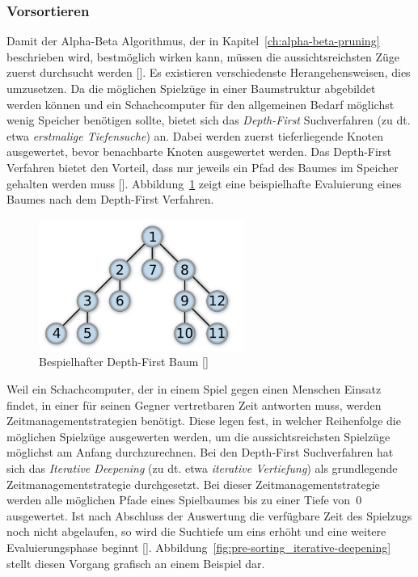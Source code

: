 \subsubsection{Vorsortieren}

Damit der Alpha-Beta Algorithmus, der in Kapitel~\ref{ch:alpha-beta-pruning} beschrieben wird, bestmöglich wirken kann, müssen die aussichtsreichsten Züge zuerst durchsucht werden [\cite{Wiki2019}].
Es existieren verschiedenste Herangehensweisen, dies umzusetzen.
Da die möglichen Spielzüge in einer Baumstruktur abgebildet werden können und ein Schachcomputer für den allgemeinen Bedarf möglichst wenig Speicher benötigen sollte, bietet sich das \textit{Depth-First} Suchverfahren (zu dt. etwa \textit{erstmalige Tiefensuche}) an.
Dabei werden zuerst tieferliegende Knoten ausgewertet, bevor benachbarte Knoten ausgewertet werden.
Das Depth-First Verfahren bietet den Vorteil, dass nur jeweils ein Pfad des Baumes im Speicher gehalten werden muss [\cite{Wiki2019b}].
Abbildung~\ref{fig:pre-sorting_depth-first-tree} zeigt eine beispielhafte Evaluierung eines Baumes nach dem Depth-First Verfahren.

\begin{figure}[H]
    \centering
    \includegraphics[width=0.6\textwidth]{images/theory/pre-sorting_depth-first-tree.png}
    \caption[Bespielhafter Depth-First Baum]{Bespielhafter Depth-First Baum [\cite{Wiki2019b}]}
    \label{fig:pre-sorting_depth-first-tree}
\end{figure}

\noindent Weil ein Schachcomputer, der in einem Spiel gegen einen Menschen Einsatz findet, in einer für seinen Gegner vertretbaren Zeit antworten muss, werden Zeitmanagementstrategien benötigt.
Diese legen fest, in welcher Reihenfolge die möglichen Spielzüge ausgewerten werden, um die aussichtsreichsten Spielzüge möglichst am Anfang durchzurechnen.
Bei den Depth-First Suchverfahren hat sich das \textit{Iterative Deepening} (zu dt. etwa \textit{iterative Vertiefung}) als grundlegende Zeitmanagementstrategie durchgesetzt.
Bei dieser Zeitmanagementstrategie werden alle möglichen Pfade eines Spielbaumes bis zu einer Tiefe von~0 ausgewertet.
Ist nach Abschluss der Auswertung die verfügbare Zeit des Spielzugs noch nicht abgelaufen, so wird die Suchtiefe um eins erhöht und eine weitere Evaluierungsphase beginnt [\cite{Wiki2019a}].
Abbildung~\ref{fig:pre-sorting_iterative-deepening} stellt diesen Vorgang grafisch an einem Beispiel dar.

